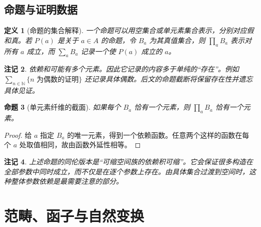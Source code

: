 \documentclass[12pt,oneside,openany,fontset=none]{ctexbook}
\theoremstyle{cn}
\newtheorem{definition}{定义}[chapter]
\newtheorem{proposition}[definition]{命题}
\newtheorem{remark}[definition]{注记}
\numberwithin{equation}{chapter}
\newcommand{\N}{\mathbb N}
\begin{document}
\section{命题与证明数据}
\begin{definition}[命题的集合解释]
一个命题可以用空集合或单元素集合表示，分别对应假和真。若 $P(a)$ 是关于 $a\in A$ 的命题，令 $B_a$ 为其真值集合，则 $\prod_aB_a$ 表示对所有 $a$ 成立，而 $\sum_aB_a$ 记录一个使 $P(a)$ 成立的 $a$。
\end{definition}
\begin{remark}
依赖和可能有多个元素。因此它记录的内容多于单纯的“存在”。例如 $\sum_{n\in\N}\{\text{$n$ 为偶数的证明}\}$ 还记录具体偶数。后文的命题截断将保留存在性并遗忘具体见证。
\end{remark}
\begin{proposition}[单元素纤维的截面]
如果每个 $B_a$ 恰有一个元素，则 $\prod_aB_a$ 恰有一个元素。
\end{proposition}
\begin{proof}
给 $a$ 指定 $B_a$ 的唯一元素，得到一个依赖函数。任意两个这样的函数在每个 $a$ 处取值相同，故由函数外延性相等。
\end{proof}
\begin{remark}
上述命题的同伦版本是“可缩空间族的依赖积可缩”。它会保证很多构造在全部参数中同时成立，而不仅是在逐个参数上存在。由具体集合过渡到空间时，这种整体参数依赖是最需要注意的部分。
\end{remark}



\chapter{范畴、函子与自然变换}
\end{document}
